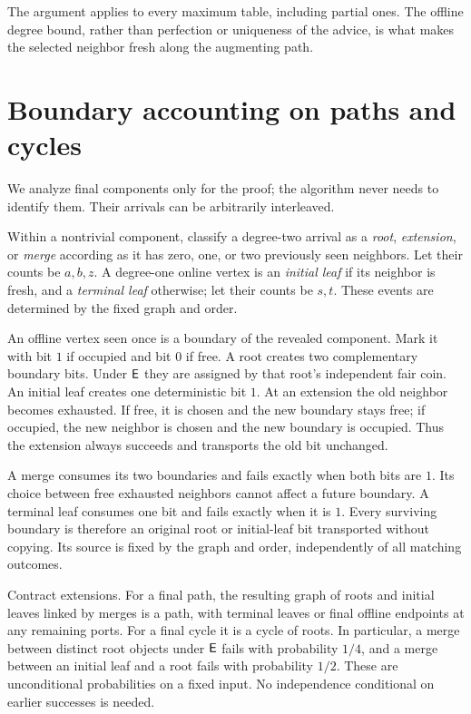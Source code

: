 The argument applies to every maximum table, including partial ones. The
offline degree bound, rather than perfection or uniqueness of the advice,
is what makes the selected neighbor fresh along the augmenting path.

\section{Boundary accounting on paths and cycles}
We analyze final components only for the proof; the algorithm never needs
to identify them. Their arrivals can be arbitrarily interleaved.

Within a nontrivial component, classify a degree-two arrival as a
\emph{root}, \emph{extension}, or \emph{merge} according as it has zero,
one, or two previously seen neighbors. Let their counts be $a,b,z$.
A degree-one online vertex is an \emph{initial leaf} if its neighbor is
fresh, and a \emph{terminal leaf} otherwise; let their counts be $s,t$.
These events are determined by the fixed graph and order.

An offline vertex seen once is a boundary of the revealed component. Mark
it with bit $1$ if occupied and bit $0$ if free. A root creates two
complementary boundary bits. Under $\mathsf{E}$ they are assigned by that root's
independent fair coin. An initial leaf creates one deterministic bit $1$.
At an extension the old neighbor becomes exhausted. If free, it is chosen
and the new boundary stays free; if occupied, the new neighbor is chosen
and the new boundary is occupied. Thus the extension always succeeds and
transports the old bit unchanged.

A merge consumes its two boundaries and fails exactly when both bits are
$1$. Its choice between free exhausted neighbors cannot affect a future
boundary. A terminal leaf consumes one bit and fails exactly when it is
$1$. Every surviving boundary is therefore an original root or initial-leaf
bit transported without copying. Its source is fixed by the graph and
order, independently of all matching outcomes.

Contract extensions. For a final path, the resulting graph of roots and
initial leaves linked by merges is a path, with terminal leaves or final
offline endpoints at any remaining ports. For a final cycle it is a cycle
of roots. In particular, a merge between distinct root objects under
$\mathsf{E}$ fails with probability $1/4$, and a merge between an initial leaf
and a root fails with probability $1/2$. These are unconditional
probabilities on a fixed input. No independence conditional on earlier
successes is needed.

